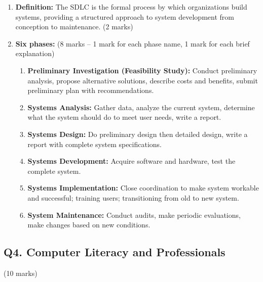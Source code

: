 \documentclass[12pt]{article}
\begin{document}
\begin{enumerate}[label=(\alph*)]
    \item \textbf{Definition:} The SDLC is the formal process by which organizations build systems, providing a structured approach to system development from conception to maintenance. \hfill (2 marks)

    \item \textbf{Six phases:} \hfill (8 marks -- 1 mark for each phase name, 1 mark for each brief explanation)

    \begin{enumerate}
        \item \textbf{Preliminary Investigation (Feasibility Study):} Conduct preliminary analysis, propose alternative solutions, describe costs and benefits, submit preliminary plan with recommendations.
        \item \textbf{Systems Analysis:} Gather data, analyze the current system, determine what the system should do to meet user needs, write a report.
        \item \textbf{Systems Design:} Do preliminary design then detailed design, write a report with complete system specifications.
        \item \textbf{Systems Development:} Acquire software and hardware, test the complete system.
        \item \textbf{Systems Implementation:} Close coordination to make system workable and successful; training users; transitioning from old to new system.
        \item \textbf{System Maintenance:} Conduct audits, make periodic evaluations, make changes based on new conditions.
    \end{enumerate}
\end{enumerate}

\bigskip

\subsection*{Q4. Computer Literacy and Professionals} \hfill (10 marks)
\end{document}
